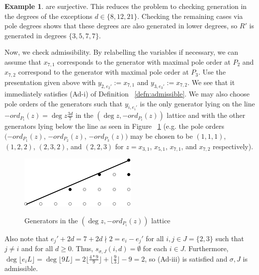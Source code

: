 \documentclass{amsart}
\theoremstyle{plain}
\theoremstyle{definition}
\newtheorem{example}[thm]{Example}
\theoremstyle{remark}
\numberwithin{equation}{section}
\newcommand \halfcan{L}
\begin{document}
\begin{example}
\noindent
are surjective. This reduces the problem to checking generation
in the degrees of the exceptions $d \in \{8, 12, 21\}$.
Checking the remaining cases via pole degrees shows that
these degrees are also generated in lower degrees,
so $R'$ is generated in degrees $\{3, 5, 7, 7\}$.

Now, we check admissibility. By relabelling the
variables if necessary, we can assume that $x_{7, 1}$ corresponds
to the generator with maximal pole order at $P_2$ and $x_{7, 2}$
correspond to the generator with maximal pole order at $P_3$. Use
the presentation given above with $y _{2, e_2'} := x_{7, 1}$ and
$y_{3, e_3'} :=  x_{7, 2}$. We see that it immediately satisfies
(Ad-i) of Definition ~\ref{defn:admissible}. We may also choose
pole orders of the generators such that $y_{i, e_i'}$ is the only
generator lying on the line $-ord_{P_i}(z) = \deg z \frac{3d}{7}$
in the $(\deg z, -ord_{P_i}(z))$  lattice and with the other
generators lying below the line as seen in Figure ~\ref{fig:377}
(e.g. the pole orders $(-ord_{P_1}(z)$, $-ord_{P_2}(z)$, $-ord_{P_3}
(z))$ may be chosen to be $(1, 1, 1)$, $(1, 2, 2)$, $(2, 3, 2)$,
and $(2, 2, 3)$ for $z = x_{3, 1}$, $x_{5, 1}$, $x_{7, 1}$, and
$x_{7, 2}$ respectively).

\begin{figure}[H]
\label{fig:377}
\includegraphics{pics/spin-377-pic-pics.pdf} \\
\caption{Generators in the $(\deg z, -ord_{P_i}(z))$ lattice}
\end{figure}

Also note that $e_j' + 2d = 7 + 2d \nmid 2 = e_i - e_j'$ for all
$i, j \in J = \{2, 3\}$ such that $j \neq i$ and for all $d \geq
0$. Thus, $s_{\sigma, J}(i, d) = \emptyset$ for each $i \in J$.
Furthermore, $\deg \lfloor e_i \halfcan \rfloor = \deg \lfloor 9
\halfcan \rfloor = 2 \lfloor \frac{4 * 9}{9} \rfloor + \lfloor
\frac{9}{3} \rfloor - 9 = 2$, so (Ad-iii) is satisfied and
$\sigma, J$ is admissible.



\end{example}
\end{document}
